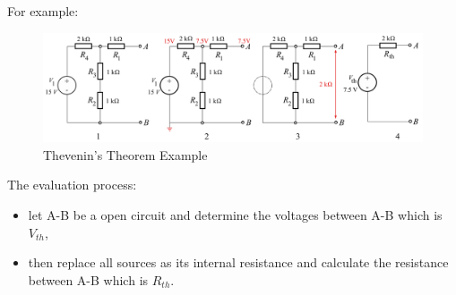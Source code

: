 \documentclass[UTF8]{article}
\begin{document}
For example:
\begin{figure}[H]
\centering
\includegraphics[scale=0.9]{Thevenin-example-png.png}
\caption{Thevenin's Theorem Example}
\end{figure}
The evaluation process:
\begin{itemize}
\item let A-B be a open circuit and determine the voltages between A-B which is $V_{th}$,
\item then replace all sources as its internal resistance and calculate the resistance between A-B which is $R_{th}$. 
\end{itemize}
\end{document}
